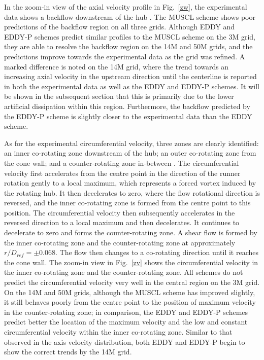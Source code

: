 In the zoom-in view of the axial velocity profile in Fig.~\ref{zw}, the experimental data shows a backflow downstream of the hub \cite{vuillemard2014experimental}. The MUSCL scheme shows poor predictions of the backflow region on all three grids. Although EDDY and EDDY-P schemes predict similar profiles to the MUSCL scheme on the 3M grid, they are able to resolve the backflow region on the 14M and 50M grids, and the predictions improve towards the experimental data as the grid was refined. {\color{red} A marked difference is noted on the 14M grid, where the trend towards an increasing axial velocity in the upstream direction until the centerline is reported in both the experimental data as well as the EDDY and EDDY-P schemes. It will be shown in the subsequent section that this is primarily due to the lower artificial dissipation within this region.} Furthermore, the backflow predicted by the EDDY-P scheme is slightly closer to the experimental data than the EDDY scheme.

As for the experimental circumferential velocity, three zones are clearly identified: an inner co-rotating zone downstream of the hub; an outer co-rotating zone from the cone wall; and a counter-rotating zone in-between \cite{vuillemard2014experimental}. The circumferential velocity first accelerates from the centre point in the direction of the runner rotation gently to a local maximum, which represents a forced vortex induced by the rotating hub. It then decelerates to zero, where the flow rotational direction is reversed, and the inner co-rotating zone is formed from the centre point to this position. The circumferential velocity then subsequently accelerates in the reversed direction to a local maximum and then decelerates. It continues to decelerate to zero and forms the counter-rotating zone.  A shear flow is formed by the inner co-rotating zone and the counter-rotating zone at approximately $r/D_{ref}=\pm 0.068$. The flow then changes to a co-rotating direction until it reaches the cone wall. The zoom-in view in Fig.~\ref{zv} shows the circumferential velocity in the inner co-rotating zone and the counter-rotating zone. All schemes do not predict the circumferential velocity very well in the central region on the 3M grid. On the 14M and 50M grids, although the MUSCL scheme has improved slightly, it still behaves poorly from the centre point to the position of maximum velocity in the counter-rotating zone; in comparison, {\color{red} the EDDY and EDDY-P schemes predict better the location of the maximum velocity and the low and constant circumferential velocity within the inner co-rotating zone. Similar to that observed in the axis velocity distribution, both EDDY and EDDY-P begin to show the correct trends by the 14M grid.}

